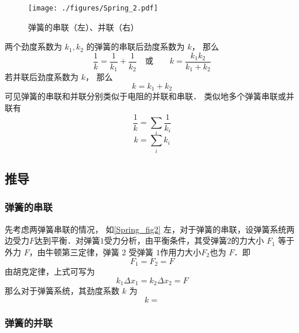 
\begin{issues}
\issueDraft
\end{issues}

\begin{figure}[ht]
\centering
\texttt{[image: ./figures/Spring\_2.pdf]}
\caption{弹簧的串联（左）、并联（右）} \label{Spring_fig2}
\end{figure}
两个劲度系数为 $k_1, k_2$ 的弹簧的串联后劲度系数为 $k$， 那么
\begin{equation}
\frac{1}{k} = \frac{1}{k_1} + \frac{1}{k_2}
\quad \text{或} \qquad
k = \frac{k_1 k_2}{k_1 + k_2}
\end{equation}
若并联后劲度系数为 $k$， 那么
\begin{equation}
k = k_1 + k_2
\end{equation}
可见弹簧的串联和并联分别类似于电阻的并联和串联． 类似地多个弹簧串联或并联有
\begin{equation}\label{Spring_eq2}
\frac{1}{k} = \sum_i \frac{1}{k_i}
\end{equation}
\begin{equation}\label{Spring_eq3}
k = \sum_i k_i
\end{equation}

\subsection{推导}
\subsubsection{弹簧的串联}
先考虑两弹簧串联的情况，
如\autoref{Spring_fig2} 左，对于弹簧的串联，设弹簧系统两边受力$F$达到平衡．对弹簧$1$受力分析，由平衡条件，其受弹簧$2$的力大小 $F_1$ 等于外力 $F$，由牛顿第三定律，弹簧 $2$ 受弹簧 $1$作用力大小$F_2$也为 $F$．即
\begin{equation}
F_1=F_2=F
\end{equation}
由胡克定律，上式可写为
\begin{equation}
k_1\Delta x_1=k_2\Delta x_2=F
\end{equation}
那么对于弹簧系统，其劲度系数 $k$ 为
\begin{equation}
k=
\end{equation}

\subsubsection{弹簧的并联}
